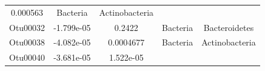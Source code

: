 \documentclass[]{article}
\begin{document}
\begin{longtable}[]{@{}ccccc@{}}
\begin{minipage}[t]{0.14\columnwidth}
0.000563\strut
\end{minipage} & \begin{minipage}[t]{0.13\columnwidth}\centering\strut
Bacteria\strut
\end{minipage} & \begin{minipage}[t]{0.27\columnwidth}\centering\strut
Actinobacteria\strut
\end{minipage}\tabularnewline
\begin{minipage}[t]{0.13\columnwidth}\centering\strut
Otu00032\strut
\end{minipage} & \begin{minipage}[t]{0.16\columnwidth}\centering\strut
-1.799e-05\strut
\end{minipage} & \begin{minipage}[t]{0.14\columnwidth}\centering\strut
0.2422\strut
\end{minipage} & \begin{minipage}[t]{0.13\columnwidth}\centering\strut
Bacteria\strut
\end{minipage} & \begin{minipage}[t]{0.27\columnwidth}\centering\strut
Bacteroidetes\strut
\end{minipage}\tabularnewline
\begin{minipage}[t]{0.13\columnwidth}\centering\strut
Otu00038\strut
\end{minipage} & \begin{minipage}[t]{0.16\columnwidth}\centering\strut
-4.082e-05\strut
\end{minipage} & \begin{minipage}[t]{0.14\columnwidth}\centering\strut
0.0004677\strut
\end{minipage} & \begin{minipage}[t]{0.13\columnwidth}\centering\strut
Bacteria\strut
\end{minipage} & \begin{minipage}[t]{0.27\columnwidth}\centering\strut
Actinobacteria\strut
\end{minipage}\tabularnewline
\begin{minipage}[t]{0.13\columnwidth}\centering\strut
Otu00040\strut
\end{minipage} & \begin{minipage}[t]{0.16\columnwidth}\centering\strut
-3.681e-05\strut
\end{minipage} & \begin{minipage}[t]{0.14\columnwidth}\centering\strut
1.522e-05\strut
\end{minipage} & \begin{minipage}[t]{0.13\columnwidth}\centering\strut

\end{minipage}
\end{longtable}
\end{document}
